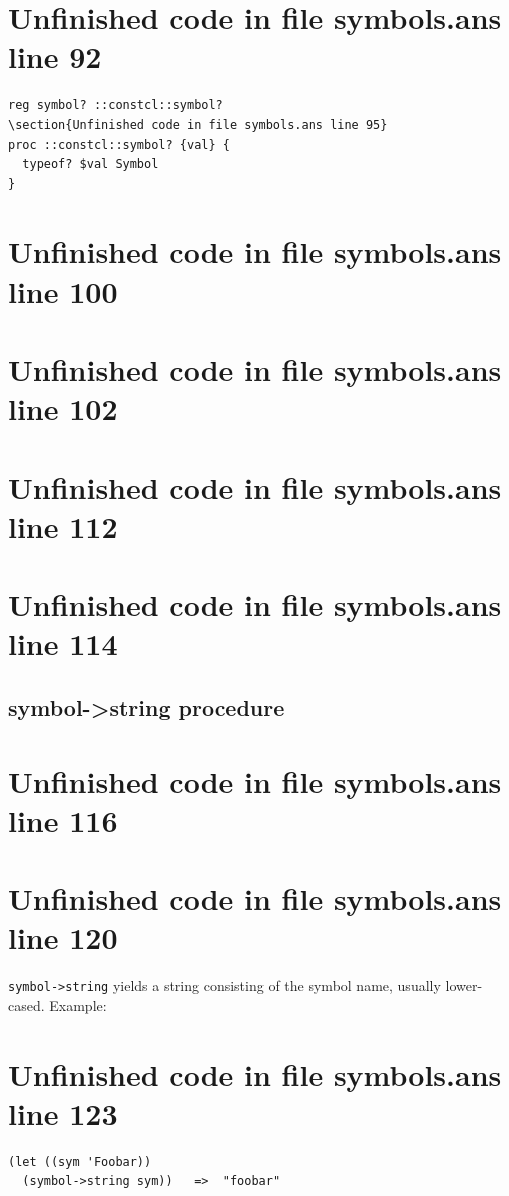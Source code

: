 \documentclass[twoside,9pt]{report}
\begin{document}
\section{Unfinished code in file symbols.ans line 92}
\begin{lstlisting}
reg symbol? ::constcl::symbol?
\section{Unfinished code in file symbols.ans line 95}
proc ::constcl::symbol? {val} {
  typeof? $val Symbol
}
\end{lstlisting}
\section{Unfinished code in file symbols.ans line 100}
\section{Unfinished code in file symbols.ans line 102}
\section{Unfinished code in file symbols.ans line 112}
\section{Unfinished code in file symbols.ans line 114}
\subsection{symbol->string procedure}
\label{symbol->string-procedure}
\section{Unfinished code in file symbols.ans line 116}

\section{Unfinished code in file symbols.ans line 120}

\texttt{symbol->string} yields a string consisting of the symbol name, usually lower-cased. Example:

\section{Unfinished code in file symbols.ans line 123}
\begin{verbatim}
(let ((sym 'Foobar))
  (symbol->string sym))   =>  "foobar"
\end{verbatim}
\end{document}
